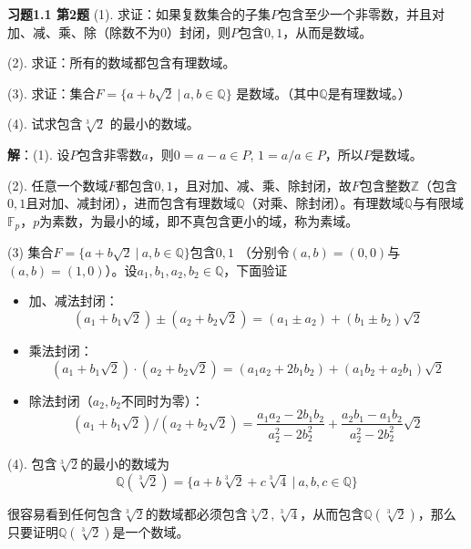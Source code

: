 \newpageorvspace

{\bf 习题1.1 第2题} (1). 求证：如果复数集合的子集$P$包含至少一个非零数，并且对加、减、乘、除（除数不为$0$）封闭，则$P$包含$0,1$，从而是数域。

(2). 求证：所有的数域都包含有理数域。

(3). 求证：集合$F = \{ a+b\sqrt{2} \ |\ a,b\in\mathbb{Q} \}$ 是数域。（其中$\mathbb{Q}$是有理数域。）

(4). 试求包含$\sqrt[3]{2}$ 的最小的数域。

{\bf 解}：(1). 设$P$包含非零数$a$，则$0 = a-a \in P$, $1 = a/a \in P$，所以$P$是数域。

(2). 任意一个数域$F$都包含$0,1$，且对加、减、乘、除封闭，故$F$包含整数$\mathbb{Z}$（包含$0,1$且对加、减封闭），进而包含有理数域$\mathbb{Q}$（对乘、除封闭）。有理数域$\mathbb{Q}$与有限域$\mathbb{F}_p$，$p$为素数，为最小的域，即不真包含更小的域，称为素域。

(3) 集合$F = \{ a+b\sqrt{2} \ |\ a,b\in\mathbb{Q} \}$包含$0,1$ （分别令$(a,b) = (0,0)$与$(a,b) = (1,0)$）。设$a_1, b_1, a_2, b_2 \in \mathbb{Q}$，下面验证
\begin{itemize}
    \item 加、减法封闭：
    $$(a_1+b_1\sqrt{2}) \pm (a_2+b_2\sqrt{2}) = (a_1 \pm a_2) + (b_1 \pm b_2)\sqrt{2}$$
    \item 乘法封闭：
    $$(a_1+b_1\sqrt{2}) \cdot (a_2+b_2\sqrt{2}) = (a_1a_2+2b_1b_2) + (a_1b_2 + a_2b_1)\sqrt{2}$$
    \item 除法封闭（$a_2, b_2$不同时为零）：
    $$(a_1+b_1\sqrt{2}) / (a_2+b_2\sqrt{2}) = \dfrac{a_1a_2-2b_1b_2}{a_2^2-2b_2^2} + \dfrac{a_2b_1-a_1b_2}{a_2^2-2b_2^2}\sqrt{2}$$
\end{itemize}

(4). 包含$\sqrt[3]{2}$的最小的数域为
$$\mathbb{Q}(\sqrt[3]{2}) = \{ a + b\sqrt[3]{2} + c\sqrt[3]{4} \ |\ a,b,c\in\mathbb{Q} \}$$

很容易看到任何包含$\sqrt[3]{2}$的数域都必须包含$\sqrt[3]{2}, \sqrt[3]{4}$，从而包含$\mathbb{Q}(\sqrt[3]{2})$，那么只要证明$\mathbb{Q}(\sqrt[3]{2})$是一个数域。


